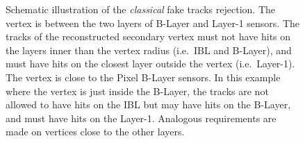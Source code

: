\begin{figure}[t]
\begin{center}
\caption{Schematic illustration of the \emph{classical} fake tracks rejection.  The vertex is between the two layers of B-Layer and Layer-1 sensors. The tracks of the reconstructed secondary vertex must not have hits on the layers inner than the vertex radius (i.e.~IBL and B-Layer), and must have hits on the closest layer outside the vertex (i.e.~Layer-1). 
 The vertex is close to the Pixel B-Layer sensors. 
In this example where the vertex is just inside the B-Layer, the tracks are not allowed to have hits on the IBL but may have hits on the B-Layer, and must have hits on the Layer-1.
Analogous requirements are made on vertices close to the other layers.
}
\label{fig:fakeRejScheme}
\end{center}
\end{figure}


